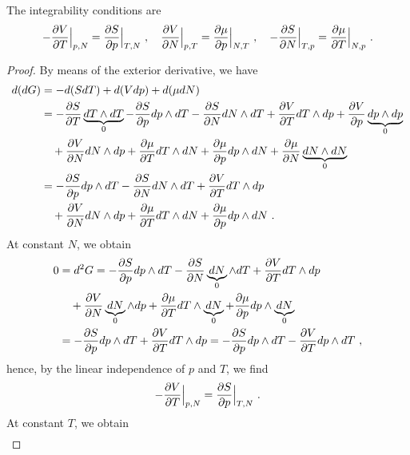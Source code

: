     The integrability conditions are 
    \begin{equation}\label{td:int:g}
        - \frac{\partial V}{\partial T} \Big \vert_{p,N} = \frac{\partial S}{\partial p} \Big \vert_{T,N} ~, \quad 
        \frac{\partial V}{\partial N} \Big \vert_{p,T} = \frac{\partial\mu}{\partial p} \Big \vert_{N, T} ~, \quad 
        - \frac{\partial S}{\partial N} \Big \vert_{T,p} = \frac{\partial\mu}{\partial T} \Big \vert_{N, p} ~. 
    \end{equation}
    \begin{proof}
        By means of the exterior derivative, we have 
        \begin{equation*}
        \begin{aligned}
            d (dG) & = - d (S dT) + d (V dp) + d (\mu dN) \\ & = - \frac{\partial S}{\partial T} \underbrace{dT \wedge dT}_0 - \frac{\partial S}{\partial p} dp \wedge dT - \frac{\partial S}{\partial N} dN \wedge dT + \frac{\partial V}{\partial T} dT \wedge dp + \frac{\partial V}{\partial p} \underbrace{dp \wedge dp}_0 \\ & \quad + \frac{\partial V}{\partial N} dN \wedge dp + \frac{\partial\mu}{\partial T} dT \wedge dN + \frac{\partial\mu}{\partial p} dp \wedge dN + \frac{\partial\mu}{\partial N} \underbrace{dN \wedge dN}_0 \\ & = - \frac{\partial S}{\partial p} dp \wedge dT - \frac{\partial S}{\partial N} dN \wedge dT + \frac{\partial V}{\partial T} dT \wedge dp \\ & \quad + \frac{\partial V}{\partial N} dN \wedge dp + \frac{\partial\mu}{\partial T} dT \wedge dN + \frac{\partial\mu}{\partial p} dp \wedge dN ~.
        \end{aligned}
        \end{equation*}
        At constant $N$, we obtain
        \begin{equation*}
        \begin{aligned}
            0 & = d^2 G = - \frac{\partial S}{\partial p} dp \wedge dT - \frac{\partial S}{\partial N} \underbrace{dN}_0 \wedge dT + \frac{\partial V}{\partial T} dT \wedge dp \\ & \quad + \frac{\partial V}{\partial N} \underbrace{dN}_0 \wedge dp + \frac{\partial\mu}{\partial T} dT \wedge \underbrace{dN}_0 + \frac{\partial\mu}{\partial p} dp \wedge \underbrace{dN}_0 \\ & = - \frac{\partial S}{\partial p} dp \wedge dT + \frac{\partial V}{\partial T} dT \wedge dp = - \frac{\partial S}{\partial p} dp \wedge dT - \frac{\partial V}{\partial T} dp \wedge dT ~,
        \end{aligned}
        \end{equation*}
        hence, by the linear independence of $p$ and $T$, we find
        \begin{equation*}
            - \frac{\partial V}{\partial T} \Big \vert_{p,N} = \frac{\partial S}{\partial p} \Big \vert_{T,N} ~.
        \end{equation*}
        At constant $T$, we obtain
        \begin{equation*}
        \begin{aligned}

\end{aligned}
\end{equation*}
\end{proof}
